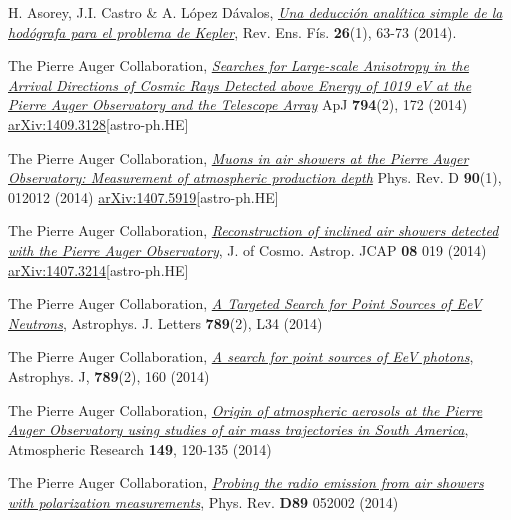 \begin{etaremune}
\item {}H. Asorey, J.I. Castro \& A. López Dávalos, \href{http://www.revistas.unc.edu.ar/index.php/revistaEF/article/view/9512}{\emph{Una deducción analítica simple de la hodógrafa para el problema de Kepler}}, Rev. Ens. Fís. {\bf{26}}(1), 63-73 (2014).

\item {}The Pierre Auger Collaboration, \href{http://dx.doi.org/10.1088/0004-637X/794/2/172}{\emph{Searches for Large-scale Anisotropy in the Arrival Directions of Cosmic Rays Detected above Energy of 1019 eV at the Pierre Auger Observatory and the Telescope Array}} ApJ {\bf{794}}(2), 172 (2014) \href{http://arxiv.org/abs/1409.3128}{arXiv:1409.3128}[astro-ph.HE]

\item {}The Pierre Auger Collaboration, \href{http://journals.aps.org/prd/abstract/10.1103/PhysRevD.90.012012}{\emph{Muons in air showers at the Pierre Auger Observatory: Measurement of atmospheric production depth}} Phys. Rev. D {\bf{90}}(1), 012012 (2014) \href{http://arxiv.org/abs/1407.5919}{arXiv:1407.5919}[astro-ph.HE]

\item {}The Pierre Auger Collaboration, \href{http://dx.doi.org/10.1088/1475-7516/2014/08/019}{\emph{Reconstruction of inclined air showers detected with the Pierre Auger Observatory}}, J. of Cosmo. Astrop. JCAP {\bf{08}} 019 (2014) \href{http://arxiv.org/abs/1407.3214}{arXiv:1407.3214}[astro-ph.HE]
  
\item {}The Pierre Auger Collaboration, \href{http://iopscience.iop.org/2041-8205/789/2/L34}{\emph{A Targeted Search for Point Sources of EeV Neutrons}}, Astrophys. J. Letters {\bf{789}}(2), L34 (2014)

\item {}The Pierre Auger Collaboration, \href{http://iopscience.iop.org/0004-637X/789/2/160}{\emph{A search for point sources of EeV photons}}, Astrophys. J, {\bf{789}}(2), 160 (2014)

\item {}The Pierre Auger Collaboration, \href{http://dx.doi.org/10.1016/j.atmosres.2014.05.021}{\emph{Origin of atmospheric aerosols at the Pierre Auger Observatory using studies of air mass trajectories in South America}}, Atmospheric Research {\bf{149}}, 120-135 (2014)

\item {}The Pierre Auger Collaboration, \href{http://dx.doi.org/10.1103/PhysRevD.89.052002}{\emph{Probing the radio emission from air showers with polarization measurements}}, Phys. Rev. {\bf{D89}} 052002 (2014)


\end{etaremune}
